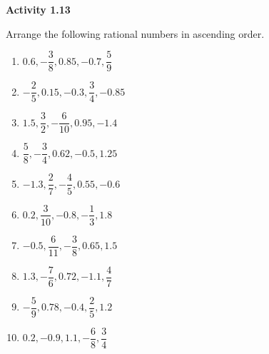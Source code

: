 \vspace{0.3ex}
\noindent\textbf{Activity 1.13}

\vspace{0.2ex}

Arrange the following rational numbers in ascending order. %
\begin{multicols}{2}
\begin{enumerate}
    \item \(0.6, -\dfrac{3}{8}, 0.85, -0.7, \dfrac{5}{9}\)
    \item \(-\dfrac{2}{5}, 0.15, -0.3, \dfrac{3}{4}, -0.85\)
    \item \(1.5, \dfrac{3}{2}, -\dfrac{6}{10}, 0.95, -1.4\)
    \item \(\dfrac{5}{8}, -\dfrac{3}{4}, 0.62, -0.5, 1.25\)
    \item \(-1.3, \dfrac{2}{7}, -\dfrac{4}{5}, 0.55, -0.6\)
    \item \(0.2, \dfrac{3}{10}, -0.8, -\dfrac{1}{3}, 1.8\)
    \item \(-0.5, \dfrac{6}{11}, -\dfrac{3}{8}, 0.65, 1.5\)
    \item \(1.3, -\dfrac{7}{6}, 0.72, -1.1, \dfrac{4}{7}\)
    \item \(-\dfrac{5}{9}, 0.78, -0.4, \dfrac{2}{5}, 1.2\)
    \item \(0.2, -0.9, 1.1, -\dfrac{6}{8}, \dfrac{3}{4}\)
\end{enumerate}
\end{multicols}
